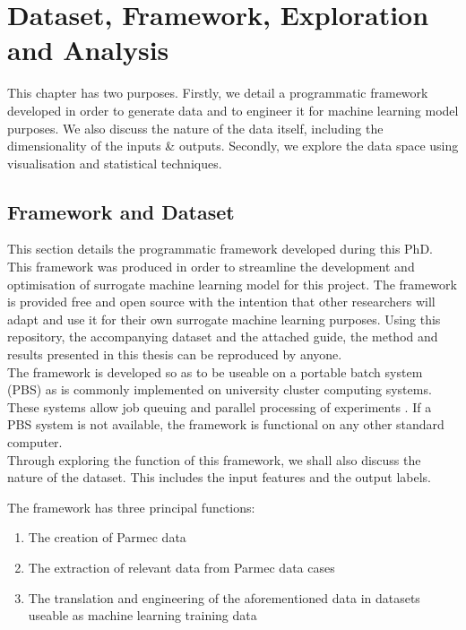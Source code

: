 \chapter{Dataset, Framework, Exploration and Analysis}
\label{cha:dataset}

This chapter has two purposes. Firstly, we detail a programmatic framework developed in order to generate data and to engineer it for machine learning model purposes. We also discuss the nature of the data itself, including the dimensionality of the inputs \& outputs. Secondly, we explore the data space using visualisation and statistical techniques.

\section{Framework and Dataset} \label{framework}

This section details the programmatic framework \cite{Jones2018} developed during this PhD. This framework was produced in order to streamline the development and optimisation of surrogate machine learning model for this project. The framework is provided free and open source with the intention that other researchers will adapt and use it for their own surrogate machine learning purposes. Using this repository, the accompanying dataset \cite{huw_rhys_jones_2022_6967536} and the attached guide, the method and results presented in this thesis can be reproduced by anyone.
\\

\noindent
The framework is developed so as to be useable on a portable batch system (PBS) as is commonly implemented on university cluster computing systems. These systems allow job queuing and parallel processing of experiments \cite{henderson1995job}. If a PBS system is not available, the framework is functional on any other standard computer.
\\

\noindent
Through exploring the function of this framework, we shall also discuss the nature of the dataset. This includes the input features and the output labels.

\noindent
The framework has three principal functions:

\begin{enumerate}
	\item The creation of Parmec data 
	\item The extraction of relevant data from Parmec data cases
	\item The translation and engineering of the aforementioned data in datasets useable as machine learning training data 
\end{enumerate}

